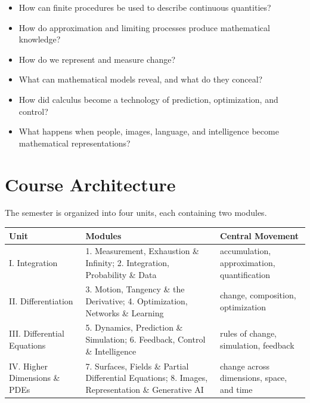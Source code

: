 \documentclass[11pt]{article}
\begin{document}
\begin{itemize}[leftmargin=*]

\item How can finite procedures be used to describe continuous quantities?

\item How do approximation and limiting processes produce mathematical
      knowledge?

\item How do we represent and measure change?

\item What can mathematical models reveal, and what do they conceal?

\item How did calculus become a technology of prediction, optimization,
      and control?

\item What happens when people, images, language, and intelligence become
      mathematical representations?

\end{itemize}


\section{Course Architecture}

The semester is organized into four units, each containing two modules.

\begin{tabularx}{\textwidth}
{@{}p{}p{}X@{}}
\toprule

\textbf{Unit} &
\textbf{Modules} &
\textbf{Central Movement}
\\
\midrule

I. Integration &
1. Measurement, Exhaustion \& Infinity;
2. Integration, Probability \& Data &
accumulation, approximation, quantification
\\

II. Differentiation &
3. Motion, Tangency \& the Derivative;
4. Optimization, Networks \& Learning &
change, composition, optimization
\\

III. Differential Equations &
5. Dynamics, Prediction \& Simulation;
6. Feedback, Control \& Intelligence &
rules of change, simulation, feedback
\\

IV. Higher Dimensions \& PDEs &
7. Surfaces, Fields \& Partial Differential Equations;
8. Images, Representation \& Generative AI &
change across dimensions, space, and time
\\

\bottomrule
\end{tabularx}
\end{document}
